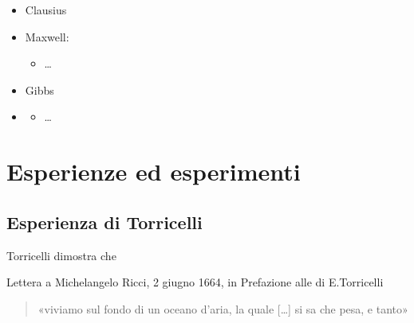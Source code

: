 \documentclass[letterpaper,10pt,italian]{jupyterBook}
\begin{document}
\sphinxAtStartPar
{}
\begin{itemize}
\item {} 
\sphinxAtStartPar
Clausius

\item {} 
\sphinxAtStartPar
Maxwell:
\begin{itemize}
\item {} 
\sphinxAtStartPar
…

\end{itemize}

\item {} 
\sphinxAtStartPar
Gibbs

\item {} 
\sphinxAtStartPar
{}
\begin{itemize}
\item {} 
\sphinxAtStartPar
…

\end{itemize}

\end{itemize}



\sphinxstepscope


\section{Esperienze ed esperimenti}
\label{\detokenize{ch/thermodynamics/foundation-experiments:esperienze-ed-esperimenti}}\label{\detokenize{ch/thermodynamics/foundation-experiments:physics-hs-thermodynamics-foundation-experiments}}\label{\detokenize{ch/thermodynamics/foundation-experiments::doc}}

\subsection{Esperienza di Torricelli}
\label{\detokenize{ch/thermodynamics/foundation-experiments:esperienza-di-torricelli}}
\sphinxAtStartPar
Torricelli dimostra che%
\begin{footnote}[1]\sphinxAtStartFootnote
Lettera a Michelangelo Ricci, 2 giugno 1664, in Prefazione alle  di E.Torricelli
%
\end{footnote}
\begin{quote}

\sphinxAtStartPar
«viviamo sul fondo di un oceano d’aria, la quale {[}…{]} si sa che pesa, e tanto»
\end{quote}
\end{document}
